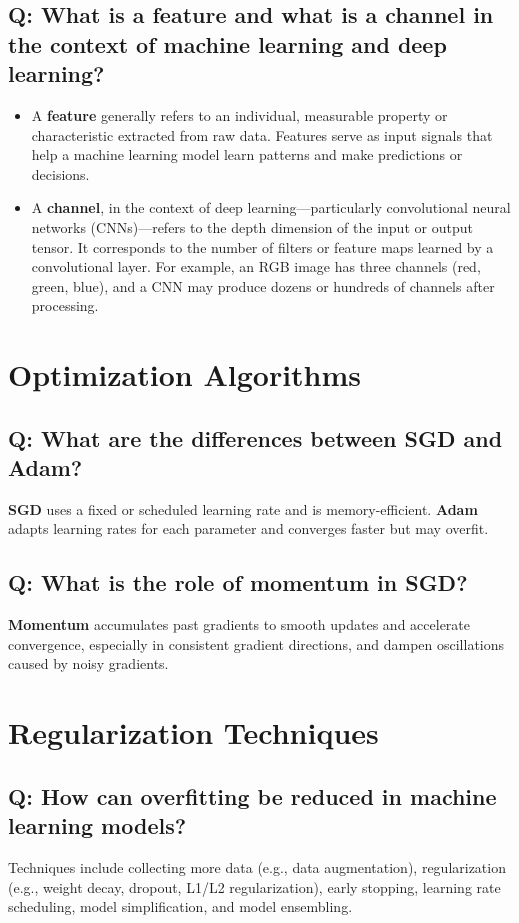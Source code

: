 \documentclass[11pt]{article}
\begin{document}
\subsection*{Q: What is a feature and what is a channel in the context of machine learning and deep learning?}
\begin{itemize}
	\item A \textbf{feature} generally refers to an individual, measurable property or characteristic extracted from raw data. Features serve as input signals that help a machine learning model learn patterns and make predictions or decisions.

	\item A \textbf{channel}, in the context of deep learning—particularly convolutional neural networks (CNNs)—refers to the depth dimension of the input or output tensor. It corresponds to the number of filters or feature maps learned by a convolutional layer. For example, an RGB image has three channels (red, green, blue), and a CNN may produce dozens or hundreds of channels after processing.
\end{itemize}

\section{Optimization Algorithms}

\subsection*{Q: What are the differences between SGD and Adam?}
\textbf{SGD} uses a fixed or scheduled learning rate and is memory-efficient. \textbf{Adam} adapts learning rates for each parameter and converges faster but may overfit.

\subsection*{Q: What is the role of momentum in SGD?}
\textbf{Momentum} accumulates past gradients to smooth updates and accelerate convergence, especially in consistent gradient directions, and dampen oscillations caused by noisy gradients.

\section{Regularization Techniques}

\subsection*{Q: How can overfitting be reduced in machine learning models?}
Techniques include collecting more data (e.g., data augmentation), regularization (e.g., weight decay, dropout, L1/L2 regularization), early stopping, learning rate scheduling, model simplification, and model ensembling.
\end{document}
